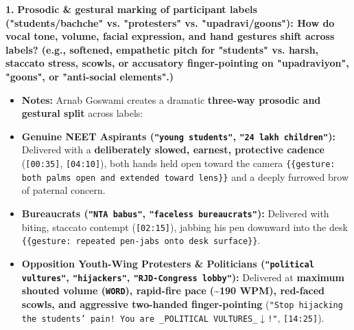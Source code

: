 \documentclass[10pt,a4paper]{article}
\begin{document}
\noindent\textbf{1.} \textbf{Prosodic \& gestural marking of participant labels ("students/bachche" vs. "protesters" vs. "upadravi/goons"): How do vocal tone, volume, facial expression, and hand gestures shift across labels? (e.g., softened, empathetic pitch for "students" vs. harsh, staccato stress, scowls, or accusatory finger-pointing on "upadraviyon", "goons", or "anti-social elements".)}\par\smallskip
\begin{itemize}
  \item \textbf{Notes:}
Arnab Goswami creates a dramatic \textbf{three-way prosodic and gestural split} across labels:\par\smallskip
  \item \textbf{Genuine NEET Aspirants (\texttt{"young students"}, \texttt{"24 lakh children"}):} Delivered with a \textbf{deliberately slowed, earnest, protective cadence} (\texttt{[00:35]}, \texttt{[04:10]}), both hands held open toward the camera \texttt{\{\{gesture: both palms open and extended toward lens\}\}} and a deeply furrowed brow of paternal concern.
  \item \textbf{Bureaucrats (\texttt{"NTA babus"}, \texttt{"faceless bureaucrats"}):} Delivered with biting, staccato contempt (\texttt{[02:15]}), jabbing his pen downward into the desk \texttt{\{\{gesture: repeated pen-jabs onto desk surface\}\}}.
  \item \textbf{Opposition Youth-Wing Protesters \& Politicians (\texttt{"political vultures"}, \texttt{"hijackers"}, \texttt{"RJD-Congress lobby"}):} Delivered at \textbf{maximum shouted volume (\texttt{WORD}), rapid-fire pace (\textasciitilde{}190 WPM), red-faced scowls, and aggressive two-handed finger-pointing} (\texttt{"Stop hijacking the students' pain! You are \_POLITICAL VULTURES\_$\downarrow$!"}, \texttt{[14:25]}).
\end{itemize}
\end{document}
